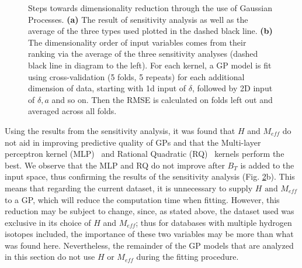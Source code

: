 \documentclass[a4paper, twoside, final, 12pt]{article}
\begin{document}
{\begin{figure}
\begin{subfigure}{0.48\linewidth}
				\caption{}
		\label{subfig:GP_dimens}
	\end{subfigure}
	\caption{Steps towards dimensionality reduction through the use of Gaussian Processes. \textbf{(a)} The result of sensitivity analysis as well as the average of the three types used plotted in the dashed black line. \textbf{(b)} The dimensionality order of input variables comes from their ranking via the average of the three sensitivity analyses (dashed black line in diagram to the left). For each kernel, a GP model is fit using cross-validation (5 folds, 5 repeats) for each additional dimension of data, starting with 1d input of $\delta$, followed by 2D input of $\delta, a$ and so on. Then the RMSE is calculated on folds left out and averaged across all folds. } \label{fig:GP_dim}
\end{figure}

Using the results from the sensitivity analysis, it was found that $H$ and $M_{eff}$ do not aid in improving predictive quality of GPs and that the Multi-layer perceptron kernel (MLP)~\cite{gpy_MLP} and Rational Quadratic (RQ)~\cite{kernel_cookbook} kernels perform the best.  We observe that the MLP and RQ do not improve after $B_T$ is added to the input space, thus confirming the results of the sensitivity analysis (Fig. \ref{fig:GP_dim}b). This means that regarding the current dataset, it is unnecessary to supply $H \text{ and } M_{eff}$ to a GP, which will reduce the computation time when fitting. However, this reduction may be subject to change, since, as stated above, the dataset used was exclusive in its choice of $H$ and $M_{eff}$; thus for databases with multiple hydrogen isotopes included, the importance of these two variables may be more than what was found here. Nevertheless, the remainder of the GP models that are analyzed in this section do not use $H$ or $M_{eff}$ during the fitting procedure. 

 

}
\end{document}

